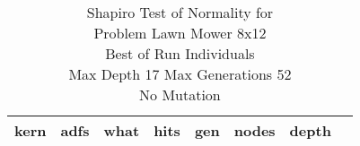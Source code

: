 \begin{table}[H]
\caption{Shapiro Test of Normality for \\ Problem  Lawn Mower 8x12\\Best of Run Individuals \\ Max Depth 17 Max Generations 52\\ No Mutation \\}
\begin{center}
\scalebox{0.8} %
{
\begin{tabular}{lrrrrrrr}
\hline
kern & adfs & what & hits & gen & nodes & depth \\
\hline


\end{tabular}
}
\end{center}
\end{table}

